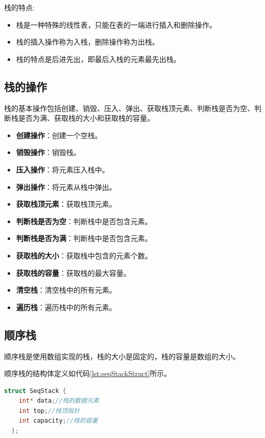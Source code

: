 \documentclass[lang=cn,newtx,10pt,scheme=chinese]{elegantbook}
\begin{document}
栈的特点:

\begin{itemize}
  \item 栈是一种特殊的线性表，只能在表的一端进行插入和删除操作。
  \item 栈的插入操作称为入栈，删除操作称为出栈。
  \item 栈的特点是后进先出，即最后入栈的元素最先出栈。
\end{itemize}
\subsection{栈的操作}

栈的基本操作包括创建、销毁、压入、弹出、获取栈顶元素、判断栈是否为空、判断栈是否为满、获取栈的大小和获取栈的容量。

\begin{itemize}
  \item \textbf{创建操作}：创建一个空栈。
  \item \textbf{销毁操作}：销毁栈。
  \item \textbf{压入操作}：将元素压入栈中。
  \item \textbf{弹出操作}：将元素从栈中弹出。
  \item \textbf{获取栈顶元素}：获取栈顶元素。
  \item \textbf{判断栈是否为空}：判断栈中是否包含元素。
  \item \textbf{判断栈是否为满}：判断栈中是否包含元素。
  \item \textbf{获取栈的大小}：获取栈中包含的元素个数。
  \item \textbf{获取栈的容量}：获取栈的最大容量。
  \item \textbf{清空栈}：清空栈中的所有元素。
  \item \textbf{遍历栈}：遍历栈中的所有元素。
\end{itemize}


\subsection{顺序栈}

顺序栈是使用数组实现的栈，栈的大小是固定的，栈的容量是数组的大小。

顺序栈的结构体定义如代码\ref{lst:seqStackStruct}所示。

\begin{lstlisting}[language=C++, caption={顺序栈结构体定义}, label={lst:seqStackStruct}]
  struct SeqStack {
    int* data;//栈的数据元素
    int top;//栈顶指针
    int capacity;//栈的容量
  };
\end{lstlisting}
\end{document}
